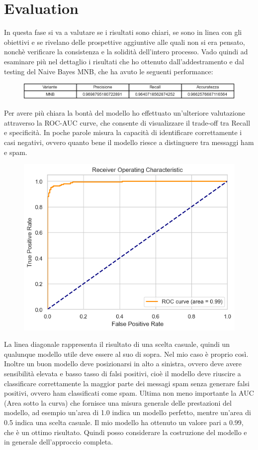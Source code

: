 \documentclass[]{article}
\begin{document}
        \section{Evaluation}
            In questa fase si va a valutare se i
            risultati sono chiari, se sono in linea con gli obiettivi e se rivelano delle prospettive aggiuntive
            alle quali non si era pensato, nonchè verificare la consistenza e la solidità dell’intero processo.
            Vado quindi ad esaminare più nel dettaglio i risultati che ho ottenuto
            dall'addestramento e dal testing  del Naive Bayes MNB, che ha avuto le seguenti performance:
            \begin{figure}[H]
                \centering
                \includegraphics[width=1\linewidth]{images/MNBresult.png}
                \label{fig:enter-label}
            \end{figure}
             Per avere più chiara la bontà del modello ho effettuato un'ulteriore valutazione attraverso la ROC-AUC curve, che consente di visualizzare il trade-off tra Recall e specificità. In poche parole misura la capacità di identificare correttamente i casi negativi, ovvero quanto bene il modello riesce a distinguere tra messaggi ham e spam.
             \begin{figure}[H]
                 \centering
                 \includegraphics[width=0.6\linewidth]{images/ROC-AUC.png}
                 \label{fig:enter-label}
             \end{figure}
             La linea diagonale rappresenta il risultato di una scelta casuale, quindi un qualunque modello utile deve essere al suo di sopra. Nel mio caso è proprio così. Inoltre un buon modello deve posizionarsi in alto a sinistra, ovvero deve avere sensibilità elevata e basso tasso di falsi positivi, cioè il modello deve riuscire a classificare correttamente la maggior parte dei messagi spam senza generare falsi positivi, ovvero ham classificati come spam. Ultima non meno importante la AUC (Area sotto la curva) che fornisce una misura generale delle prestazioni del modello, ad esempio un'area di 1.0 indica un modello perfetto, mentre un'area di 0.5 indica una scelta casuale. Il mio modello ha ottenuto un valore pari a 0.99, che è un ottimo risultato.
             Quindi posso considerare la costruzione del modello e in generale dell'approccio completa.
\end{document}
